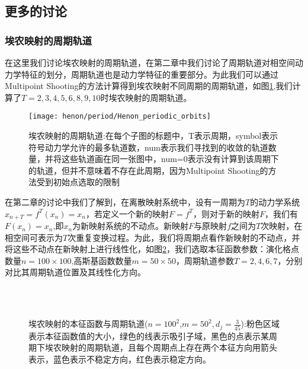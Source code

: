 \subsection{更多的讨论}
\subsubsection{埃农映射的周期轨道}
在这里我们讨论埃农映射的周期轨道，在第二章中我们讨论了周期轨道对相空间动力学特征的划分，周期轨道也是动力学特征的重要部分。为此我们可以通过Multipoint Shooting的方法计算得到埃农映射不同周期的周期轨道，如图\ref{fig:Henon_periodic_orbits},我们计算了$T=2,3,4,5,6,8,9,10$时埃农映射的周期轨道。
\begin{figure}
	\centering
	\texttt{[image: henon/period/Henon\_periodic\_orbits]}
    \caption[埃农映射的周期轨道]{埃农映射的周期轨道:在每个子图的标题中，T表示周期，symbol表示符号动力学允许的最多轨道数，num表示我们寻找到的收敛的轨道数量，并将这些轨道画在同一张图中，num=0表示没有计算到该周期下的轨道，但并不意味着不存在此周期，因为Multipoint Shooting的方法受到初始点选取的限制}\label{fig:Henon_periodic_orbits}
\end{figure}
在第二章的讨论中我们了解到，在离散映射系统中，设有一周期为$T$的动力学系统$x_{n+T}=f^T(x_n)=x_n$，若定义一个新的映射$F=f^T$，则对于新的映射$F$，我们有$F(x_n)=x_n$,即$x_n$为新映射系统的不动点。新映射$F$与原映射$f$之间为$T$次映射，在相空间可表示为$T$次重复变换过程。为此，我们将周期点看作新映射的不动点，并将这些不动点在新映射上进行线性化，如图\ref{fig:Henon_eigen_Gauss_period_n100m50T7}，我们选取本征函数参数：演化格点数量$n=100\times 100$,高斯基函数数量$m=50\times 50$，周期轨道参数$T=2,4,6,7$，分别对比其周期轨道位置及其线性化方向。
\begin{figure}
    \centering
    \\
    \\
    \caption[埃农映射的本征函数与周期轨道]{埃农映射的本征函数与周期轨道($n=100^2$,$m=50^2,d_j=\frac{3}{45}$):粉色区域表示本征函数值的大小，绿色的线表示吸引子域，黑色的点表示某周期下埃农映射的周期轨道，且每个周期点上存在两个本征方向用箭头表示，蓝色表示不稳定方向，红色表示稳定方向。}\label{fig:Henon_eigen_Gauss_period_n100m50T7}
\end{figure}
